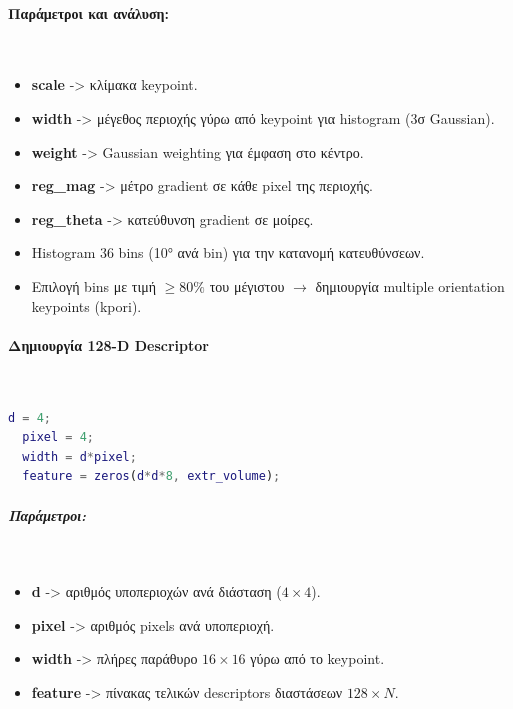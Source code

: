 \documentclass[12pt]{article}
\begin{document}
  \paragraph{Παράμετροι και ανάλυση:}
  \mbox{}\\
  \begin{itemize}
      \item \textbf{scale} -> κλίμακα keypoint.
      \item \textbf{width} -> μέγεθος περιοχής γύρω από keypoint για histogram (3σ Gaussian).
      \item \textbf{weight} -> Gaussian weighting για έμφαση στο κέντρο.
      \item \textbf{reg\_mag} -> μέτρο gradient σε κάθε pixel της περιοχής.
      \item \textbf{reg\_theta} -> κατεύθυνση gradient σε μοίρες.
      \item Histogram 36 bins (10° ανά bin) για την κατανομή κατευθύνσεων.
      \item Επιλογή bins με τιμή $\geq 80\%$ του μέγιστου $\rightarrow$ δημιουργία multiple orientation keypoints (kpori).
  \end{itemize}
  

\paragraph{Δημιουργία 128-D Descriptor}
\mbox{}\\
\begin{lstlisting}[language=Matlab]
  d = 4;         
  pixel = 4;       
  width = d*pixel; 
  feature = zeros(d*d*8, extr_volume);
  \end{lstlisting}
  
  \subparagraph{Παράμετροι:}
  \mbox{}\\
  \begin{itemize}
      \item \textbf{d} -> αριθμός υποπεριοχών ανά διάσταση ($4 \times 4$).
      \item \textbf{pixel} -> αριθμός pixels ανά υποπεριοχή.
      \item \textbf{width} -> πλήρες παράθυρο $16 \times 16$ γύρω από το keypoint.
      \item \textbf{feature} -> πίνακας τελικών descriptors διαστάσεων $128 \times N$.
  \end{itemize}
  
\end{document}

